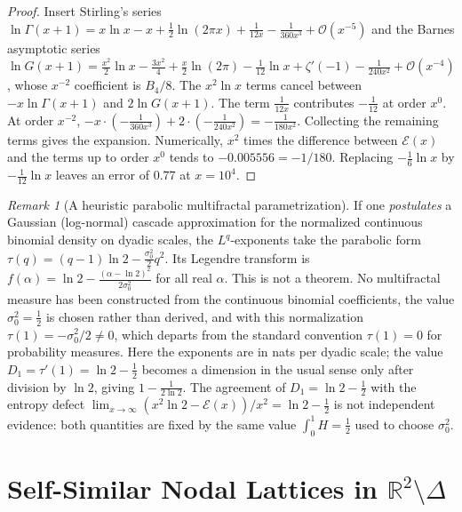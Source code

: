 \documentclass[11pt,a4paper]{article}
\theoremstyle{plain}
\theoremstyle{definition}
\theoremstyle{remark}
\newtheorem{remark}[theorem]{Remark}
\numberwithin{equation}{section}
\begin{document}
\begin{proof}
Insert Stirling's series $\ln\Gamma(x+1) = x\ln x - x + \frac{1}{2}\ln(2\pi x) + \frac{1}{12x} - \frac{1}{360x^3} + \mathcal{O}(x^{-5})$ and the Barnes asymptotic series $\ln G(x+1) = \frac{x^2}{2}\ln x - \frac{3x^2}{4} + \frac{x}{2}\ln(2\pi) - \frac{1}{12}\ln x + \zeta'(-1) - \frac{1}{240x^2} + \mathcal{O}(x^{-4})$ \cite{barnes1900}, whose $x^{-2}$ coefficient is $B_4/8$. The $x^2\ln x$ terms cancel between $-x\ln\Gamma(x+1)$ and $2\ln G(x+1)$. The term $\frac{1}{12x}$ contributes $-\frac{1}{12}$ at order $x^0$. At order $x^{-2}$, $-x \cdot (-\frac{1}{360x^3}) + 2 \cdot (-\frac{1}{240x^2}) = -\frac{1}{180x^2}$. Collecting the remaining terms gives the expansion. Numerically, $x^2$ times the difference between $\mathcal{E}(x)$ and the terms up to order $x^0$ tends to $-0.005556 = -1/180$. Replacing $-\frac16\ln x$ by $-\frac1{12}\ln x$ leaves an error of $0.77$ at $x = 10^4$.
\end{proof}

\begin{remark}[A heuristic parabolic multifractal parametrization]
If one \emph{postulates} a Gaussian (log-normal) cascade approximation for the normalized continuous binomial density on dyadic scales, the $L^q$-exponents take the parabolic form $\tau(q) = (q-1)\ln 2 - \frac{\sigma_0^2}{2}q^2$. Its Legendre transform is $f(\alpha) = \ln 2 - \frac{(\alpha - \ln 2)^2}{2\sigma_0^2}$ for all real $\alpha$. This is not a theorem. No multifractal measure has been constructed from the continuous binomial coefficients, the value $\sigma_0^2 = \frac12$ is chosen rather than derived, and with this normalization $\tau(1) = -\sigma_0^2/2 \neq 0$, which departs from the standard convention $\tau(1) = 0$ for probability measures. Here the exponents are in nats per dyadic scale; the value $D_1 = \tau'(1) = \ln 2 - \frac12$ becomes a dimension in the usual sense only after division by $\ln 2$, giving $1 - \frac{1}{2\ln 2}$. The agreement of $D_1 = \ln 2 - \frac12$ with the entropy defect $\lim_{x\to\infty}(x^2\ln 2 - \mathcal{E}(x))/x^2 = \ln 2 - \frac12$ is not independent evidence: both quantities are fixed by the same value $\int_0^1 H = \frac12$ used to choose $\sigma_0^2$.
\end{remark}

\section[Self-Similar Nodal Lattices outside the Simplex]{Self-Similar Nodal Lattices in \texorpdfstring{$\mathbb{R}^2 \setminus \Delta$}{R\textasciicircum 2 \textbackslash{} Delta}}
\end{document}
